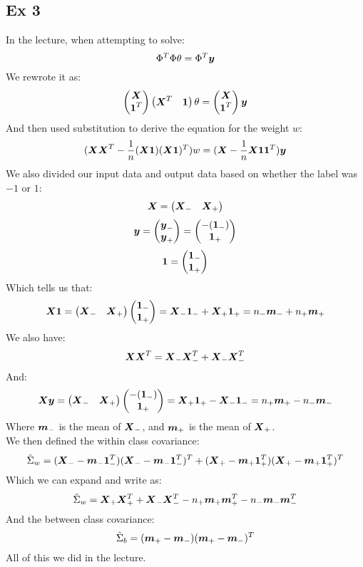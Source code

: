 \documentclass[12pt]{article}
\begin{document}
\newpage

\subsection*{Ex 3}

In the lecture, when attempting to solve:
\[ \Phi^T\Phi \theta = \Phi^T \bl{y} \]
We rewrote it as:
\[ \pmat{\bl{X} \\ \bl{1}^T}\pmat{\bl{X}^T & \bl{1}}
\theta = \pmat{\bl{X} \\ \bl{1}^T}\bl{y} \]
And then used substitution to derive
the equation for the weight $w$:
\[ (\bl{X}\bl{X}^T - \dfrac{1}{n}(\bl{X}\bl{1})(\bl{X}\bl{1})^T) w
= (\bl{X} - \dfrac{1}{n}\bl{X}\bl{1} \bl{1}^T) \bl{y} \]
We also divided our input data
and output data based on whether
the label was $-1$ or $1$:
\[ \bl{X} = \pmat{\bl{X}_- & \bl{X}_+} \]
\[ \bl{y} = \pmat{\bl{y}_- \\ \bl{y}_+}
= \pmat{-(\bl{1}_-) \\ \bl{1}_+} \]
\[ \bl{1} = \pmat{\bl{1}_- \\ \bl{1}_+} \]
Which tells us that:
\[ \bl{X}\bl{1} = \pmat{\bl{X}_- & \bl{X}_+}
\pmat{\bl{1}_- \\ \bl{1}_+} 
= \bl{X}_-\bl{1}_- + \bl{X}_+\bl{1}_+
= n_-\bl{m}_- + n_+\bl{m}_+ \]
We also have:
\[ \bl{X}\bl{X}^T = \bl{X}_-\bl{X}^T_- + \bl{X}_-\bl{X}^T_- \]
And:
\[ \bl{X}\bl{y} = \pmat{\bl{X}_- & \bl{X}_+}
\pmat{-(\bl{1}_-) \\ \bl{1}_+} 
= \bl{X}_+\bl{1}_+ - \bl{X}_-\bl{1}_-
= n_+\bl{m}_+ - n_-\bl{m}_- \]
Where $\bl{m}_-$ is the mean of $\bl{X}_-$,
and $\bl{m}_+$ is the mean of $\bl{X}_+$. \\
We then defined the within class covariance:
\[ \hat{\Sigma}_w 
= (\bl{X}_- - \bl{m}_-\bl{1}^T_-)(\bl{X}_- 
- \bl{m}_-\bl{1}^T_-)^T
+ (\bl{X}_+ - \bl{m}_+\bl{1}^T_+)(\bl{X}_+ 
- \bl{m}_+\bl{1}^T_+)^T \]
Which we can expand and write as:
\[ \hat{\Sigma}_w = \bl{X}_+\bl{X}^T_+
+ \bl{X}_-\bl{X}^T_- -n_+\bl{m}_+\bl{m}^T_+
-n_-\bl{m}_-\bl{m}^T_- \]
And the between class covariance:
\[ \hat{\Sigma}_b = (\bl{m}_+ 
- \bl{m}_-)(\bl{m}_+ - \bl{m}_-)^T \]
All of this we did in the lecture. \\
\end{document}
